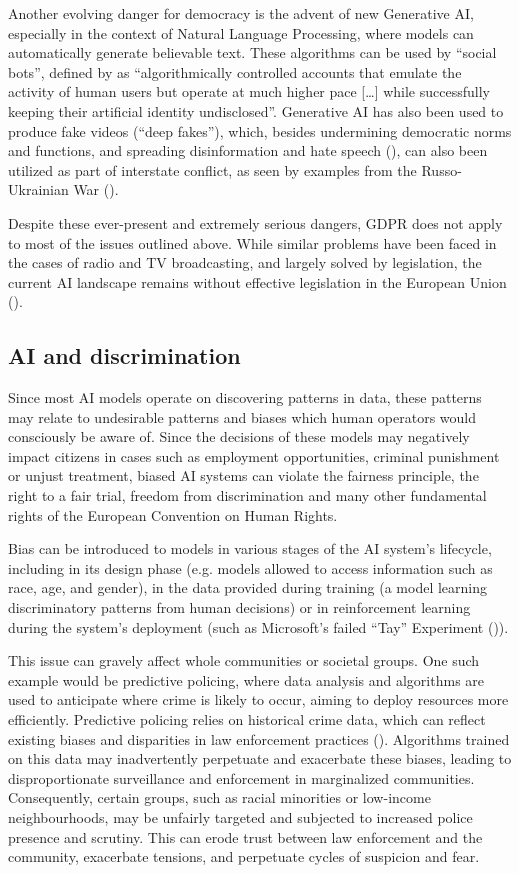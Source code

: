 \documentclass{article}
\begin{document}
Another evolving danger for democracy is the advent of new Generative AI, especially in the context of Natural Language Processing, where models can automatically generate believable text. These algorithms can be used by “social bots”, defined by \cite{wagner2018} as “algorithmically controlled accounts that emulate the activity of human users but operate at much higher pace […] while successfully keeping their artificial identity undisclosed”. Generative AI has also been used to produce fake videos (“deep fakes”), which, besides undermining democratic norms and functions, and spreading disinformation and hate speech (\cite{pawelec2022}), can also been utilized as part of interstate conflict, as seen by examples from the Russo-Ukrainian War (\cite{deepfake2022, deepfake2024}).

Despite these ever-present and extremely serious dangers, GDPR does not apply to most of the issues outlined above. While similar problems have been faced in the cases of radio and TV broadcasting, and largely solved by legislation, the current AI landscape remains without effective legislation in the European Union (\cite{wagner2018}).


\subsection{AI and discrimination}
\label{ssec:discrimination}

Since most AI models operate on discovering patterns in data, these patterns may relate to undesirable patterns and biases which human operators would consciously be aware of. Since the decisions of these models may negatively impact citizens in cases such as employment opportunities, criminal punishment or unjust treatment, biased AI systems can violate the fairness principle, the right to a fair trial, freedom from discrimination and many other fundamental rights of the  European Convention on Human Rights.

Bias can be introduced to models in various stages of the AI system's lifecycle, including in its design phase (e.g. models allowed to access information such as race, age, and gender), in the data provided during training (a model learning discriminatory patterns from human decisions) or in reinforcement learning during the system's deployment (such as Microsoft's failed “Tay” Experiment (\cite{tay})).

This issue can gravely affect whole communities or societal groups. One such example would be predictive policing, where data analysis and algorithms are used to anticipate where crime is likely to occur, aiming to deploy resources more efficiently. Predictive policing relies on historical crime data, which can reflect existing biases and disparities in law enforcement practices (\cite{wagner2018}). Algorithms trained on this data may inadvertently perpetuate and exacerbate these biases, leading to disproportionate surveillance and enforcement in marginalized communities. Consequently, certain groups, such as racial minorities or low-income neighbourhoods, may be unfairly targeted and subjected to increased police presence and scrutiny. This can erode trust between law enforcement and the community, exacerbate tensions, and perpetuate cycles of suspicion and fear.
\end{document}
